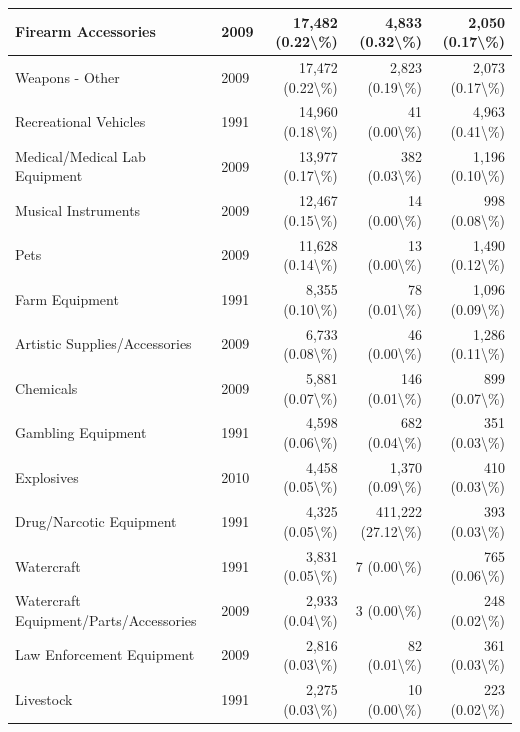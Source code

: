 \documentclass[
]{krantz}
\begin{document}
\begin{longtable}[t]{l|l|r|r|r}
\hline
Firearm Accessories & 2009 & 17,482 (0.22\textbackslash{}\%) & 4,833 (0.32\textbackslash{}\%) & 2,050 (0.17\textbackslash{}\%)\\
\hline
Weapons - Other & 2009 & 17,472 (0.22\textbackslash{}\%) & 2,823 (0.19\textbackslash{}\%) & 2,073 (0.17\textbackslash{}\%)\\
\hline
Recreational Vehicles & 1991 & 14,960 (0.18\textbackslash{}\%) & 41 (0.00\textbackslash{}\%) & 4,963 (0.41\textbackslash{}\%)\\
\hline
Medical/Medical Lab Equipment & 2009 & 13,977 (0.17\textbackslash{}\%) & 382 (0.03\textbackslash{}\%) & 1,196 (0.10\textbackslash{}\%)\\
\hline
Musical Instruments & 2009 & 12,467 (0.15\textbackslash{}\%) & 14 (0.00\textbackslash{}\%) & 998 (0.08\textbackslash{}\%)\\
\hline
Pets & 2009 & 11,628 (0.14\textbackslash{}\%) & 13 (0.00\textbackslash{}\%) & 1,490 (0.12\textbackslash{}\%)\\
\hline
Farm Equipment & 1991 & 8,355 (0.10\textbackslash{}\%) & 78 (0.01\textbackslash{}\%) & 1,096 (0.09\textbackslash{}\%)\\
\hline
Artistic Supplies/Accessories & 2009 & 6,733 (0.08\textbackslash{}\%) & 46 (0.00\textbackslash{}\%) & 1,286 (0.11\textbackslash{}\%)\\
\hline
Chemicals & 2009 & 5,881 (0.07\textbackslash{}\%) & 146 (0.01\textbackslash{}\%) & 899 (0.07\textbackslash{}\%)\\
\hline
Gambling Equipment & 1991 & 4,598 (0.06\textbackslash{}\%) & 682 (0.04\textbackslash{}\%) & 351 (0.03\textbackslash{}\%)\\
\hline
Explosives & 2010 & 4,458 (0.05\textbackslash{}\%) & 1,370 (0.09\textbackslash{}\%) & 410 (0.03\textbackslash{}\%)\\
\hline
Drug/Narcotic Equipment & 1991 & 4,325 (0.05\textbackslash{}\%) & 411,222 (27.12\textbackslash{}\%) & 393 (0.03\textbackslash{}\%)\\
\hline
Watercraft & 1991 & 3,831 (0.05\textbackslash{}\%) & 7 (0.00\textbackslash{}\%) & 765 (0.06\textbackslash{}\%)\\
\hline
Watercraft Equipment/Parts/Accessories & 2009 & 2,933 (0.04\textbackslash{}\%) & 3 (0.00\textbackslash{}\%) & 248 (0.02\textbackslash{}\%)\\
\hline
Law Enforcement Equipment & 2009 & 2,816 (0.03\textbackslash{}\%) & 82 (0.01\textbackslash{}\%) & 361 (0.03\textbackslash{}\%)\\
\hline
Livestock & 1991 & 2,275 (0.03\textbackslash{}\%) & 10 (0.00\textbackslash{}\%) & 223 (0.02\textbackslash{}\%)\\

\end{longtable}
\end{document}
